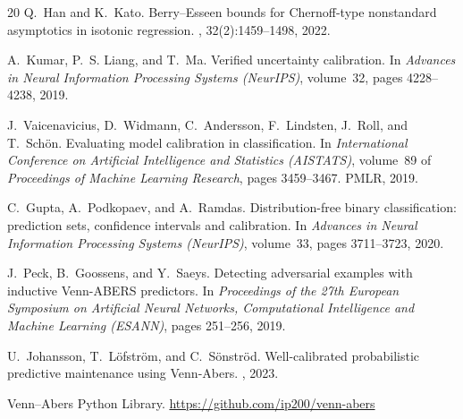 \documentclass[11pt]{article}
\begin{document}
\begin{thebibliography}{20}
		Q.~Han and K.~Kato.
		\newblock Berry--Esseen bounds for Chernoff-type nonstandard asymptotics in isotonic regression.
		, 32(2):1459--1498, 2022.

		A.~Kumar, P.~S. Liang, and T.~Ma.
		\newblock Verified uncertainty calibration.
		\newblock In {\em Advances in Neural Information Processing Systems (NeurIPS)}, volume~32, pages 4228--4238, 2019.

		J.~Vaicenavicius, D.~Widmann, C.~Andersson, F.~Lindsten, J.~Roll, and T.~Sch{\"o}n.
		\newblock Evaluating model calibration in classification.
		\newblock In {\em International Conference on Artificial Intelligence and Statistics (AISTATS)}, volume~89 of {\em Proceedings of Machine Learning Research}, pages 3459--3467. PMLR, 2019.

		C.~Gupta, A.~Podkopaev, and A.~Ramdas.
		\newblock Distribution-free binary classification: prediction sets, confidence intervals and calibration.
		\newblock In {\em Advances in Neural Information Processing Systems (NeurIPS)}, volume~33, pages 3711--3723, 2020.
		
		J.~Peck, B.~Goossens, and Y.~Saeys.
		\newblock Detecting adversarial examples with inductive Venn-ABERS predictors.
		\newblock In {\em Proceedings of the 27th European Symposium on Artificial Neural Networks, Computational Intelligence and Machine Learning (ESANN)}, pages 251--256, 2019.

		U.~Johansson, T.~L{\"o}fstr{\"o}m, and C.~S{\"o}nstr{\"o}d.
		\newblock Well-calibrated probabilistic predictive maintenance using Venn-Abers.
		, 2023.

		Venn--Abers Python Library.
		\newblock \url{https://github.com/ip200/venn-abers}
		
	\end{thebibliography}
	
\end{document}
